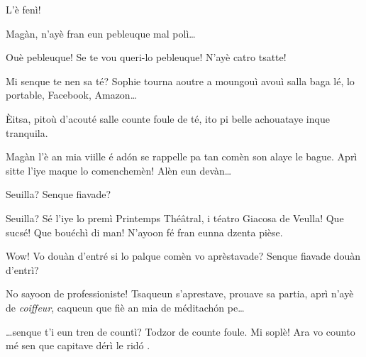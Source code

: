 \begin{drama}
\Spectateurspeaks{} L'è fenì! 





\Nevaousaspeaks Magàn, n'ayè fran eun pebleuque mal polì\ldots

\Maganspeaks Ouè pebleuque! Se te vou queri-lo pebleuque! N'ayè catro tsat\-te!

\Paganspeaks Mi senque te nen sa té? Sophie tourna aoutre a moungouì avouì salla baga lé, lo portable, Facebook, Amazon\ldots


\Maganspeaks \`Eitsa, pitoù d'acouté salle counte foule de té, ito pi belle achouataye inque tranquila.

\Paganspeaks{} Magàn l'è an mia viille é ad\'on se rappelle pa tan comèn son alaye le bague. Aprì sitte l'iye maque lo comenchemèn! Alèn eun devàn\ldots


\Nevaouspeaks{}  Seuilla? Senque fiavade?

\Paganspeaks Seuilla? Sé l'iye lo premì Printemps Thé\^atral, i téatro Giacosa de Veulla! Que sucsé! Que bouéchì di man! N'ayoon fé fran eunna dzenta pièse.

\Nevaousaspeaks Wow! Vo douàn d'entré si lo palque comèn vo aprèstavade? Senque fiavade douàn d'entrì?

\Paganspeaks{} No sayoon de professioniste! Tsaqueun s'aprestave, prouave sa partia, aprì n'ayè de \textit{coiffeur}, caqueun que fiè an mia de méditach\'on pe\ldots

\Maganspeaks \ldots senque t'i eun tren de countì? Todzor de counte foule. Mi soplè! Ara vo counto mé  sen que capitave dérì le rid\'o .




\end{drama}
